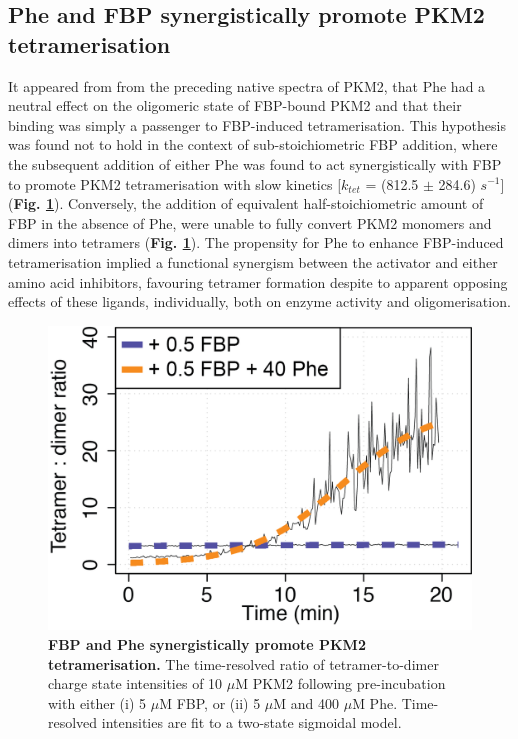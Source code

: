 \subsection{Phe and FBP synergistically promote PKM2 tetramerisation}
\label{subsec:phe_fbp_synergistic_tet}
It appeared from from the preceding native spectra of PKM2, that Phe had a neutral effect on the oligomeric state of FBP-bound PKM2 and that their binding was simply a passenger to FBP-induced tetramerisation. This hypothesis was found not to hold in the context of sub-stoichiometric FBP addition, where the subsequent addition of either Phe was found to act synergistically with FBP to promote PKM2 tetramerisation with slow kinetics [$k_{tet}$ = (812.5 $\pm$ 284.6) $s^{-1}$] (\textbf{Fig. \ref{fig:phe_fbp_time}}). Conversely, the addition of equivalent half-stoichiometric amount of FBP in the absence of Phe, were unable to fully convert PKM2 monomers and dimers into tetramers (\textbf{Fig. \ref{fig:phe_fbp_time}}). The propensity for Phe to enhance FBP-induced tetramerisation implied a functional synergism between the activator and either amino acid inhibitors, favouring tetramer formation despite to apparent opposing effects of these ligands, individually, both on enzyme activity and oligomerisation.
%
%
%
%
%
\begin{figure}[!ht]
\includegraphics[scale=0.8]{ch5_fig10_fbp_phe_tet_time.png}
\caption[FBP and Phe synergistically promote PKM2 tetramerisation.] {\textbf{FBP and Phe synergistically promote PKM2 tetramerisation.} The time-resolved ratio of tetramer-to-dimer charge state intensities of 10 $\mu$M PKM2 following pre-incubation with either (i) 5 $\mu$M FBP, or (ii) 5 $\mu$M and 400 $\mu$M Phe. Time-resolved intensities are fit to a two-state sigmoidal model.}
\label{fig:phe_fbp_time}
\end{figure}
%
%
\clearpage

